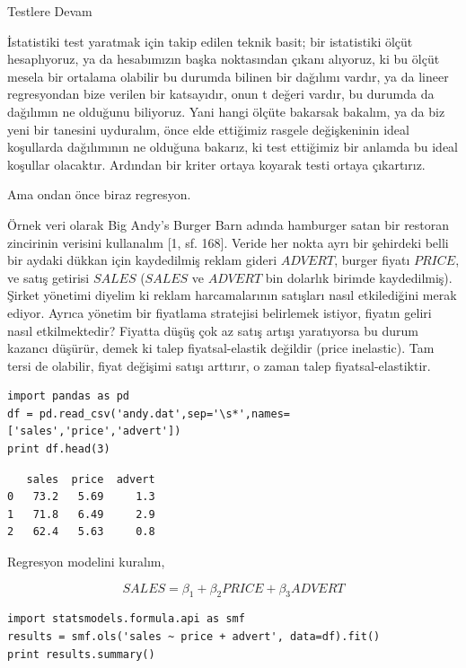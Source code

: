 \documentclass[12pt,fleqn]{article}\usepackage{../../common}
\begin{document}
Testlere Devam

İstatistiki test yaratmak için takip edilen teknik basit; bir istatistiki
ölçüt hesaplıyoruz, ya da hesabımızın başka noktasından çıkanı alıyoruz, ki
bu ölçüt mesela bir ortalama olabilir bu durumda bilinen bir dağılımı
vardır, ya da lineer regresyondan bize verilen bir katsayıdır, onun t
değeri vardır, bu durumda da dağılımın ne olduğunu biliyoruz. Yani hangi
ölçüte bakarsak bakalım, ya da biz yeni bir tanesini uyduralım, önce elde
ettiğimiz rasgele değişkeninin ideal koşullarda dağılımının ne olduğuna
bakarız, ki test ettiğimiz bir anlamda bu ideal koşullar
olacaktır. Ardından bir kriter ortaya koyarak testi ortaya çıkartırız.

Ama ondan önce biraz regresyon.

Örnek veri olarak Big Andy's Burger Barn adında hamburger satan bir
restoran zincirinin verisini kullanalım [1, sf. 168]. Veride her nokta ayrı
bir şehirdeki belli bir aydaki dükkan için kaydedilmiş reklam gideri
$ADVERT$, burger fiyatı $PRICE$, ve satış getirisi $SALES$ ($SALES$ ve
$ADVERT$ bin dolarlık birimde kaydedilmiş). Şirket yönetimi diyelim ki
reklam harcamalarının satışları nasıl etkilediğini merak ediyor. Ayrıca
yönetim bir fiyatlama stratejisi belirlemek istiyor, fiyatın geliri nasıl
etkilmektedir? Fiyatta düşüş çok az satış artışı yaratıyorsa bu durum
kazancı düşürür, demek ki talep fiyatsal-elastik değildir (price
inelastic). Tam tersi de olabilir, fiyat değişimi satışı arttırır, o zaman
talep fiyatsal-elastiktir.

\begin{verbatim}
import pandas as pd
df = pd.read_csv('andy.dat',sep='\s*',names=['sales','price','advert'])
print df.head(3)
\end{verbatim}

\begin{verbatim}
   sales  price  advert
0   73.2   5.69     1.3
1   71.8   6.49     2.9
2   62.4   5.63     0.8
\end{verbatim}

Regresyon modelini kuralım,

$$ SALES = \beta_1 + \beta_2 PRICE + \beta_3 ADVERT $$

\begin{verbatim}
import statsmodels.formula.api as smf
results = smf.ols('sales ~ price + advert', data=df).fit()
print results.summary()
\end{verbatim}
\end{document}
